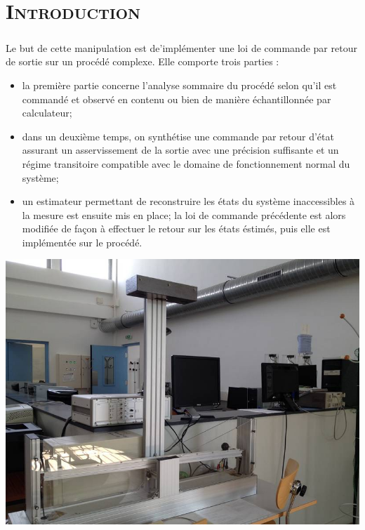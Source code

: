 \chapter*{\textsc{Introduction}}

	\paragraph{} Le but de cette manipulation est de'implémenter une loi de commande par retour de sortie sur un procédé complexe. Elle comporte trois parties : 
	
	\begin{itemize} [label=,font=\small \color{black}]
  	\item la première partie concerne l'analyse sommaire du procédé selon qu'il est commandé et observé en contenu ou bien de manière échantillonnée par calculateur;\\ 
    \item dans un deuxième temps, on synthétise une commande par retour d'état assurant un asservissement de la sortie avec une précision suffisante et un régime transitoire compatible avec le domaine de fonctionnement normal du système; \\
    \item un estimateur permettant de reconstruire les états du système inaccessibles à la mesure est ensuite mis en place; la loi de commande précédente est alors modifiée de façon à effectuer le retour sur les états éstimés, puis elle est implémentée sur le procédé.\\
	\end{itemize}
	
	\begin{center}
	\includegraphics[scale=0.4]{bille.jpg}
	\label{fig1} 
	\end{center}	

